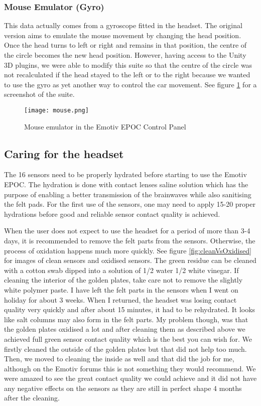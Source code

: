 \subsubsection{Mouse Emulator (Gyro)}

This data actually comes from a gyroscope fitted in the headset. The original version aims to emulate the mouse movement by changing the head position. Once the head turns to left or right and remains in that position, the centre of the circle becomes the new head position. However, having access to the Unity 3D plugins, we were able to modify this suite so that the centre of the circle was not recalculated if the head stayed to the left or to the right because we wanted to use the gyro as yet another way to control the car movement. See figure \ref{fig:gyro} for a screenshot of the suite.

\begin{figure}
  \centering
  \texttt{[image: mouse.png]}
  \caption{Mouse emulator in the Emotiv EPOC Control Panel}
    \label{fig:gyro}           
\end{figure}

\subsection{Caring for the headset}
The 16 sensors need to be properly hydrated before starting to use the Emotiv EPOC. The hydration is done with contact lenses saline solution which has the purpose of enabling a better transmission of the brainwaves while also sanitising the felt pads. For the first use of the sensors, one may need to apply 15-20 proper hydrations before good and reliable sensor contact quality is achieved.

When the user does not expect to use the headset for a period of more than 3-4 days, it is recommended to remove the felt parts from the sensors. Otherwise, the process of oxidation happens much more quickly. See figure \ref{fig:cleanVsOxidised} for images of clean sensors and oxidised sensors. The green residue can be cleaned with a cotton swab dipped into a solution of 1/2 water 1/2 white vinegar. If cleaning the interior of the golden plates, take care not to remove the slightly white polymer paste. I have left the felt parts in the sensors when I went on holiday for about 3 weeks. When I returned, the headset was losing contact quality very quickly and after about 15 minutes, it had to be rehydrated. It looks like salt columns may also form in the felt parts. My problem though, was that the golden plates oxidised a lot and after cleaning them as described above we achieved full green sensor contact quality which is the best you can wish for. We firstly cleaned the outside of the golden plates but that did not help too much. Then, we moved to cleaning the inside as well and that did the job for me, although on the Emotiv forums this is not something they would recommend. We were amazed to see the great contact quality we could achieve and it did not have any negative effects on the sensors as they are still in perfect shape 4 months after the cleaning.

